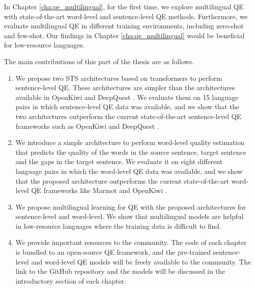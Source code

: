 In Chapter \ref{cha:qe_multilingual}, for the first time, we explore multilingual QE with state-of-the-art word-level and sentence-level QE methods. Furthermore, we evaluate multilingual QE in different training environments, including zero-shot and few-shot. Our findings in Chapter \ref{cha:qe_multilingual} would be beneficial for low-resource languages. 


The main contributions of this part of the thesis are as follows.

\begin{enumerate}

	\item We propose two STS architectures based on transformers to perform sentence-level QE. These architectures are simpler than the  architectures available in OpenKiwi \autocite{kepler-etal-2019-openkiwi} and DeepQuest \autocite{ive-etal-2018-deepquest}. We evaluate them on 15 language pairs in which sentence-level QE data was available, and we show that the two architectures outperform the current state-of-the-art sentence-level QE frameworks such as OpenKiwi \autocite{kepler-etal-2019-openkiwi} and DeepQuest \autocite{ive-etal-2018-deepquest}.
	
	
	\item We introduce a simple architecture to perform word-level quality estimation that predicts the quality of the words in the source sentence, target sentence and the gaps in the target sentence. We evaluate it on eight different language pairs in which the word-level QE data was available, and we show that the proposed architecture outperforms the current state-of-the-art word-level QE frameworks like Marmot \autocite{logacheva-etal-2016-marmot} and OpenKiwi \autocite{kepler-etal-2019-openkiwi}.

	\item We propose multilingual learning for QE with the proposed architectures for sentence-level and word-level. We show that multilingual models are helpful in low-resource languages where the training data is difficult to find. 
	
	\item We provide important resources to the community. The code of each chapter is bundled to an open-source QE framework, and the pre-trained sentence-level and word-level QE models will be freely available to the community.  The link to the GitHub repository and the models will be discussed in the introductory section of each chapter. 
\end{enumerate}

